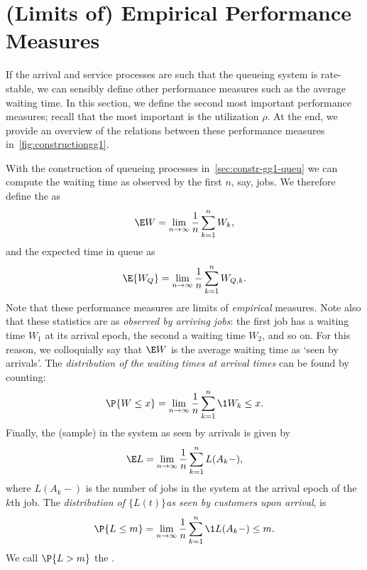 \section{(Limits of) Empirical Performance Measures}
\label{sec:limits-of-emperical}




If the arrival and service processes are such that the queueing system is rate-stable, we can sensibly define other performance measures such as the average waiting time.
In this section, we define the second most important performance measures; recall that the most important is the utilization $\rho$.
At the end, we provide an overview of the relations between these performance measures in~\cref{fig:constructiongg1}.


With the construction of queueing processes in~\cref{sec:constr-gg1-queu} we can compute the waiting time as observed by the first $n$, say, jobs.
We therefore define the  as
\begin{equation}\label{eq:49}
 \E W = \lim_{n\to\infty} \frac 1n\sum_{k=1}^n W_k,
\end{equation}
and the expected time in queue as
\begin{equation}\label{eq:50}
 \E{W_Q} = \lim_{n\to\infty} \frac 1 n\sum_{k=1}^n W_{Q,k}.
\end{equation}
Note that these performance measures are limits of \emph{empirical} measures.
Note also that these statistics are as \emph{observed by arriving jobs}: the first job has a waiting time $W_1$ at its arrival epoch, the second a waiting time $W_2$, and so on.
For this reason, we colloquially say that $\E W$ is the average waiting time as `seen by arrivals'.
The \emph{distribution of the waiting times at arrival times} can be found by counting:
\begin{equation}\label{eq:48}
 \P{W \leq x} = \lim_{n\to\infty} \frac 1n\sum_{k=1}^n \1{W_k\leq x}.
\end{equation}
Finally, the (sample)  in the system as seen by arrivals is given by
\begin{equation}\label{eq:EQ}
\E L = \lim_{n\to\infty}\frac 1 n \sum_{k=1}^n L(A_k-),
\end{equation}
where $L(A_k-)$ is the number of jobs in the system at the arrival epoch of the $k$th job.
The \emph{distribution of $\{L(t)\}$as seen by customers upon arrival}, is
\begin{equation}\label{eq:Qm}
\P{L\leq m} = \lim_{n\to\infty} \frac 1 n \sum_{k=1}^n \1{L(A_k-) \leq m}.
\end{equation}
We call $\P{L > m}$ the .



